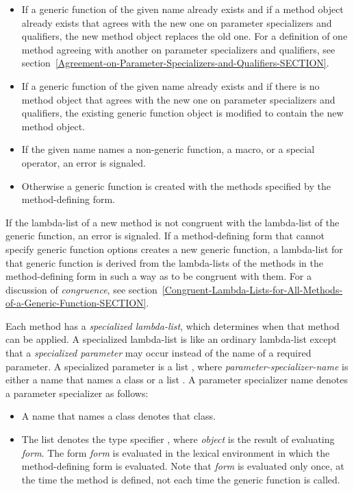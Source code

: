 \begin{itemize}

\item  If a generic function of the given name already exists
and if a method object already exists that agrees with the new one on
parameter specializers and qualifiers, the new method object replaces
the old one.  For a definition of one method agreeing with another on
parameter specializers and qualifiers, see
section~\ref{Agreement-on-Parameter-Specializers-and-Qualifiers-SECTION}.

\item  If a generic function of the given name already exists
and if there is no method object that agrees with the new one on
parameter specializers and qualifiers, the existing generic function
object is modified to contain the new method object.

\item  If the given name names a non-generic function, a macro,
or a special operator, an error is signaled.

\item  Otherwise a generic function is created with the methods
specified by the method-defining form.

\end{itemize}

If the lambda-list of a new method is not congruent with the lambda-list
of the generic function, an error is signaled.  If a
method-defining form that cannot specify generic function options
creates a new generic function, a lambda-list for that generic
function is derived from the lambda-lists of the methods in the
method-defining form in such a way as to be congruent with them.  For
a discussion of \emph{congruence}, see
section~\ref{Congruent-Lambda-Lists-for-All-Methods-of-a-Generic-Function-SECTION}.

Each method has a \emph{specialized lambda-list}, which determines
when that method can be applied.  A specialized lambda-list is like
an ordinary lambda-list except that a \emph{specialized parameter}
may occur instead of the name of a required parameter.  A specialized parameter
is a list ,
where \emph{parameter-specializer-name} is either
a name that names a class or a list .
A parameter specializer name denotes a parameter specializer as follows:
 
\begin{itemize}
\item  A name that names a class denotes that class.

\item  The list  denotes the type specifier
, where \emph{object} is the result of
evaluating \emph{form}.  The form \emph{form} is evaluated in the
lexical environment in which the method-defining form is
evaluated.  Note that \emph{form} is evaluated only once, at the time
the method is defined, not each time the generic function is called.
\end{itemize}

